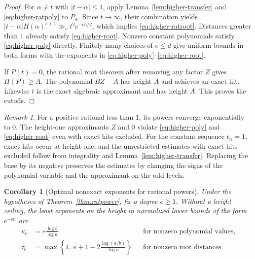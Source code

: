\documentclass[11pt,a4paper,reqno]{amsart}
\newtheorem{corollary}[theorem]{Corollary}
\theoremstyle{definition}
\theoremstyle{remark}
\newtheorem{remark}[theorem]{Remark}
\numberwithin{equation}{section}
\begin{document}
\begin{proof}
For \(\alpha\ne t\) with \(|t-\alpha|\le1\), apply
Lemma~\ref{lem:higher-transfer} and
\eqref{eq:higher-ratpoly} to \(P_\alpha\). Since \(t\to
\infty\), their combination yields
\(\lvert t-\alpha\rvert H(\alpha)^{e+1}
 \gg_e t^2 e^{-\epsilon n/2}\), which implies
\eqref{eq:higher-ratroot}. Distances greater than \(1\)
already satisfy \eqref{eq:higher-root}. Nonzero constant
polynomials satisfy \eqref{eq:higher-poly} directly.
Finitely many choices of \(e\le d\) give uniform bounds
in both forms with the exponents in
\eqref{eq:higher-poly}--\eqref{eq:higher-root}.

If \(P(t)=0\), the rational root theorem after removing
any factor \(Z\) gives \(H(P)\ge A\). The polynomial
\(BZ-A\) has height \(A\) and achieves an exact hit.
Likewise \(t\) is the exact algebraic approximant and
has height \(A\). This proves the cutoffs.
\end{proof}

\begin{remark}
For a positive rational less than \(1\), its powers
converge exponentially to \(0\). The height-one
approximants \(Z\) and \(0\) violate
\eqref{eq:higher-poly} and \eqref{eq:higher-root} even
with exact hits excluded. For the constant sequence
\(t_n=1\), exact hits occur at height one, and the
unrestricted estimates with exact hits excluded follow
from integrality and Lemma~\ref{lem:higher-transfer}.
Replacing the base by its negative preserves the
estimates by changing the signs of the polynomial
variable and the approximant on the odd levels.
\end{remark}

\begin{corollary}[Optimal nonexact exponents for rational powers]
\label{cor:higher-rat-exponents}
Under the hypotheses of Theorem~\ref{thm:ratpower}, fix
a degree \(e\ge1\). Without a height ceiling, the least
exponents on the height in normalized lower bounds of
the form \(e^{-\epsilon n}\) are
\begin{align*}
  \kappa_e &= e\frac{\log b}{\log a}
       &&\text{for nonzero polynomial values},\\
  \tau_e &= \max\!\left\{1,\ e+1-2\frac{\log(a/b)}{\log a}\right\}
       &&\text{for nonzero root distances}.
\end{align*}
\end{corollary}
\end{document}
